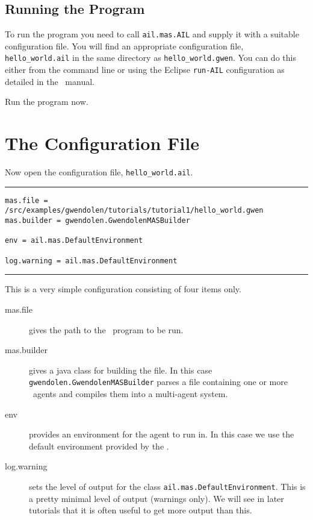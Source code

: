\documentclass[a4]{article}
\begin{document}
\subsection{Running the Program}

To run the program you need to call \texttt{ail.mas.AIL} and supply it with a suitable configuration file.  You will find an appropriate configuration file, \texttt{hello\_world.ail} in the same directory as \texttt{hello\_world.gwen}.  You can do this either from the command line or using the Eclipse \texttt{run-AIL} configuration as detailed in the \mcapl\ manual.

Run the program now.

\section{The Configuration File}
Now open the configuration file, \texttt{hello\_world.ail}.

\noindent\rule{\textwidth}{1pt}
\begin{verbatim}
mas.file = /src/examples/gwendolen/tutorials/tutorial1/hello_world.gwen
mas.builder = gwendolen.GwendolenMASBuilder

env = ail.mas.DefaultEnvironment

log.warning = ail.mas.DefaultEnvironment
\end{verbatim}
\rule{\textwidth}{1pt}

This is a very simple configuration consisting of four items only.
\begin{description}
\item[mas.file] gives the path to the \gwendolen\ program to be run.
\item[mas.builder] gives a java class for building the file.  In this case \texttt{gwendolen.GwendolenMASBuilder} parses a file containing one or more \gwendolen\ agents and compiles them into a multi-agent system.
\item[env] provides an environment for the agent to run in.  In this case we use the default environment provided by the \ail.
\item[log.warning] sets the level of output for the class \texttt{ail.mas.DefaultEnvironment}.  This is a pretty minimal level of output (warnings only).  We will see in later tutorials that it is often useful to get more output than this.
\end{description}
\end{document}
